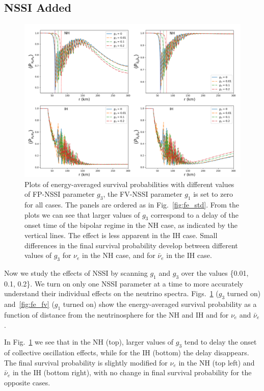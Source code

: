 \documentclass[a4paper,12pt]{article}
\begin{document}
\subsection{NSSI Added}
\begin{figure}[t]
\begin{center}
\includegraphics[width=14cm]{flavor_evo_fp.png}
\caption{Plots of energy-averaged survival probabilities with different values of FP-NSSI parameter $g_3$, the FV-NSSI parameter $g_1$ is set to zero for all cases. The panels are ordered as in Fig.~\ref{fig:fe_std}. From the plots we can see that larger values of $g_3$ correspond to a delay of the onset time of the bipolar regime in the NH case, as indicated by the vertical lines. The effect is less apparent in the IH case. Small differences in the final survival probability develop between different values of $g_3$ for $\nu_e$ in the NH case, and for $\bar \nu_e$ in the IH case.}
\label{fig:fe_fp}
\end{center}
\end{figure}

Now we study the effects of NSSI by scanning $g_1$ and $g_3$ over the values \{0.01, 0.1, 0.2\}. We turn on only one NSSI parameter at a time to more accurately understand their individual effects on the neutrino spectra. Figs.~\ref{fig:fe_fp} ($g_{3}$ turned on) and~\ref{fig:fe_fv} ($g_{1}$ turned on) show the energy-averaged survival probability as a function of distance from the neutrinosphere for the NH and IH and for $\nu_{e}$ and $\bar{\nu}_{e}$.

In Fig.~\ref{fig:fe_fp} we see that in the NH (top), larger values of $g_{3}$ tend to delay the onset of collective oscillation effects, while for the IH (bottom) the delay disappears. The final survival probability is slightly modified for $\nu_{e}$ in the NH (top left) and $\bar{\nu}_{e}$ in the IH (bottom right), with no change in final survival probability for the opposite cases. 
\end{document}
